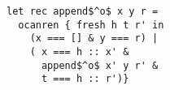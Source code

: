 \begin{lstlisting}
let rec append$^o$ x y r =
  ocanren { fresh h t r' in
    (x === [] & y === r) |
    ( x === h :: x' &
      append$^o$ x' y r' &
      t === h :: r')}
\end{lstlisting}